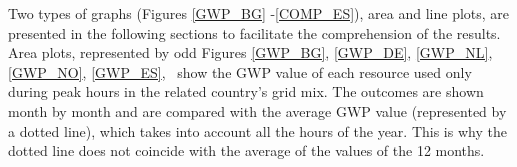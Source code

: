 { \begin{table}[htbp]
\centering
\caption{Emission factors of power production technologies. Extracted from \cite{Turconi2013LifeLimitations}.}
\label{EmissionFactors}
\end{table}



Two types of graphs (Figures \ref{GWP_BG} -\ref{COMP_ES}), area and line plots, are presented in the following sections to facilitate the comprehension of the results. Area plots, represented by odd Figures \ref{GWP_BG}, \ref{GWP_DE}, \ref{GWP_NL}, \ref{GWP_NO}, \ref{GWP_ES}, 
~show the GWP value of each resource used only during peak hours in the related country's grid mix. The outcomes are shown month by month and are compared with the average GWP value (represented by a dotted line), which takes into account all the hours of the year. This is why the dotted line does not coincide with the average of the values of the 12 months. %

}
